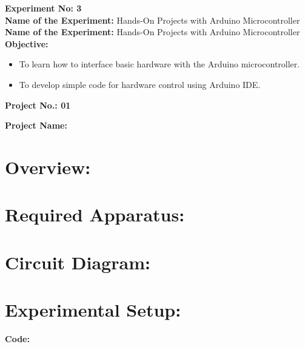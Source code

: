 \documentclass[a4paper,12pt]{article}
\begin{document}
	
	\textbf{Experiment No: 3} \\
	\textbf{Name of the Experiment:} Hands-On Projects with Arduino Microcontroller \\
	{\fontsize{14pt}{16pt}\selectfont\textbf{Name of the Experiment:}} Hands-On Projects with Arduino Microcontroller \\
	
	\textbf{Objective:}
	
	
	\begin{itemize}
		\item To learn how to interface basic hardware with the Arduino microcontroller.
		\item To develop simple code for hardware control using Arduino IDE.
	\end{itemize}
	
	
	
	{\fontsize{14pt}{0pt}\selectfont\textbf{Project No.: 01}}  
	
	\textbf{Project Name:}
    \section*{Overview:}
    \section*{Required Apparatus:}
	\section*{Circuit Diagram:}
	\section*{Experimental Setup:}
	\newpage
	\vspace{0.5cm}
	\textbf{Code:}
	
\end{document}
